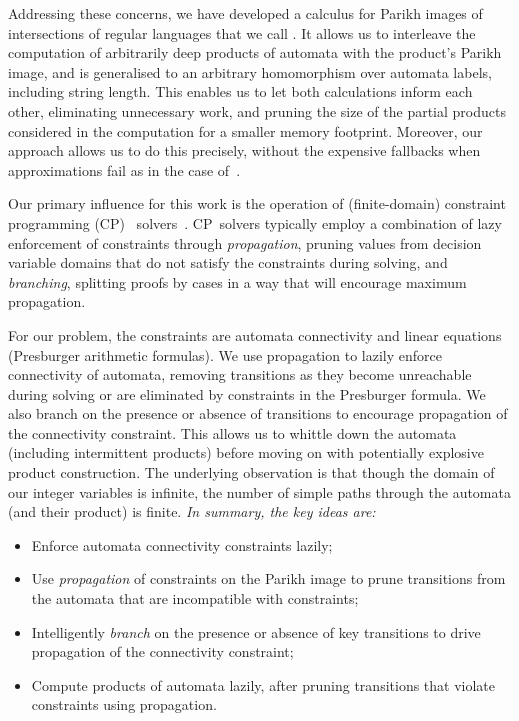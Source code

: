 Addressing these concerns, we have developed a calculus for Parikh images of
intersections of regular languages that we call \Calculus{}. It allows us to
interleave the computation of arbitrarily deep products of automata with the
product's Parikh image, and is generalised to an arbitrary homomorphism over
automata labels, including string length. This enables us to let both
calculations inform each other, eliminating unnecessary work, and pruning the
size of the partial products considered in the computation for a smaller memory
footprint. Moreover, our approach allows us to do this precisely, without the expensive
fallbacks when approximations fail as in the case of~\cite{approximate-parikh}.

Our primary influence for this work is the operation of (finite-domain) 
constraint programming (CP)%
~solvers~\cite{cp}. CP~solvers typically employ a combination of lazy enforcement
of constraints through \emph{propagation},
pruning values from decision variable domains that do not satisfy 
the constraints during solving, and \emph{branching}, splitting proofs
by cases in a way that will encourage maximum propagation.

For our problem, the constraints are automata connectivity and linear
equations (Presburger arithmetic formulas).
We use propagation to lazily enforce connectivity of automata,
removing transitions as they become unreachable during solving or are
eliminated by constraints in the Presburger formula. We
also branch on the presence or absence of transitions to
encourage propagation of the connectivity constraint. This allows
us to whittle down the automata
(including intermittent products) before moving on with potentially
 explosive product construction. The underlying observation
is that though the domain of our integer variables
is infinite, the number of simple paths
through the automata (and their product) is finite.
\emph{In summary, the key ideas are:}

{
    \centering
    \begin{tcolorbox}[colback=ourcolour!5!white,colframe=ourcolour!75!black,%
        title=Key paradigms in \Calculus{},%
        width=0.9\linewidth]

        \begin{itemize}
            \item Enforce automata connectivity constraints lazily;
            \item Use \emph{propagation} of constraints on the Parikh image to prune
            transitions from the automata that are incompatible with constraints;
            \item Intelligently \emph{branch} on the presence or absence of key
             transitions to drive propagation of the connectivity constraint;
             \item Compute products of automata lazily, after pruning transitions
             that violate constraints using propagation.
        \end{itemize}
    \end{tcolorbox}
  }

